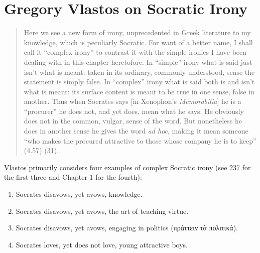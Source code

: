 \documentclass[12pt,letterpaper]{article}
\newcommand{\MONTH}{%
  \ifcase\the\month
  \or January%
  \or February%
  \or March%
  \or April%
  \or May%
  \or June%
  \or July%
  \or August%
  \or September%
  \or October%
  \or November%
  \or December%
  \fi}
\begin{document}

\pagestyle{notes}

\section*{Gregory Vlastos on Socratic Irony}

\begin{quote}

    Here we see a new form of irony, unprecedented in Greek literature to my knowledge, which is peculiarly Socratic.
For want of a better name, I shall call it ``complex irony'' to contrast it with the simple ironies I have been dealing with in this chapter heretofore.
In ``simple'' irony what is said just isn't what is meant: taken in its ordinary, commonly understood, sense the statement is simply false.
In ``complex'' irony what is said both is and isn't what is meant: its surface content is meant to be true in one sense, false in another.
Thus when Socrates says [in Xenophon's \textit{Memorabilia}] he is a ``procurer'' he does not, and yet does, mean what he says.
He obviously does not in the common, vulgar, sense of the word.
But nonetheless he does in another sense he gives the word \textit{ad hoc}, making it mean someone ``who makes the procured attractive to those whose company he is to keep'' (4.57) (31).

\end{quote}

Vlastos primarily considers four examples of complex Socratic irony (see 237 for the first three and Chapter 1 for the fourth):

\begin{enumerate}
    \item Socrates disavows, yet avows, knowledge.
    \item Socrates disavows, yet avows, the art of teaching virtue.
    \item Socrates disavows, yet avows, engaging in politics (\textgreek{πράττειν τὰ πολιτικά}).
    \item Socrates loves, yet does not love, young attractive boys.
\end{enumerate}
\end{document}
